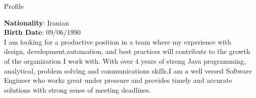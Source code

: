
\begin{jrsection}[location = sidebar]{Profile}
    \begin{jrdescription}
        {\bfseries Nationality}: Iranian \\
        {\bfseries Birth Date}: 09/06/1990 \\
    I am looking for a productive position in a team where my experience with design, development,automation, and best practices will contribute to the growth of the organization I work with.
    With over 4 years of strong Java programming, analytical, problem solving and communications skills,I am a well versed Software Engineer who works great under pressure and provides timely and accurate solutions with strong sense of meeting deadlines.
    \end{jrdescription}
\end{jrsection}
